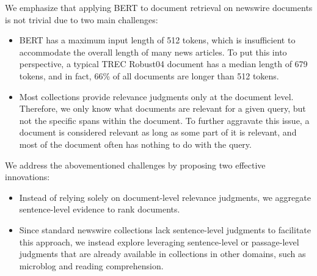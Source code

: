 We emphasize that applying BERT to document retrieval on newswire documents is not trivial due to two main challenges:\

\begin{itemize}
	\item
	BERT has a maximum input length of 512 tokens, which is insufficient to accommodate the overall length of many news articles.
	To put this into perspective, a typical TREC Robust04 document has a median length of 679 tokens, and in fact, 66\% of all documents are longer than 512 tokens.
	\item
	Most collections provide relevance judgments only at the document level.
	Therefore, we only know what documents are relevant for a given query, but not the specific spans within the document.
	To further aggravate this issue, a document is considered relevant as long as some part of it is relevant, and most of the document often has nothing to do with the query.
\end{itemize}


We address the abovementioned challenges by proposing two effective innovations:\

\begin{itemize}
	\item
	Instead of relying solely on document-level relevance judgments, we aggregate sentence-level evidence to rank documents.
	\item
	Since standard newswire collections lack sentence-level judgments to facilitate this approach, we instead explore leveraging sentence-level or passage-level judgments that are already available in collections in other domains, such as microblog and reading comprehension.
\end{itemize}


